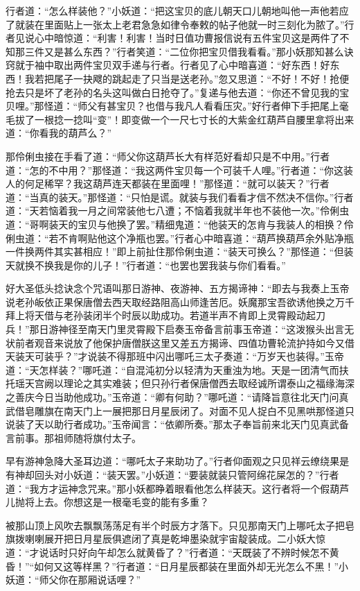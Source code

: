 \documentclass[12pt,UTF8]{ctexbook}
\begin{document}
行者道：“怎么样装他？”小妖道：“把这宝贝的底儿朝天口儿朝地叫他一声他若应了就装在里面贴上一张太上老君急急如律令奉敕的帖子他就一时三刻化为脓了。”行者见说心中暗惊道：“利害！利害！当时日值功曹报信说有五件宝贝这是两件了不知那三件又是甚么东西？”行者笑道：“二位你把宝贝借我看看。”那小妖那知甚么诀窍就于袖中取出两件宝贝双手递与行者。行者见了心中暗喜道：“好东西！好东西！我若把尾子一抉飕的跳起走了只当是送老孙。”忽又思道：“不好！不好！抢便抢去只是坏了老孙的名头这叫做白日抢夺了。”复递与他去道：“你还不曾见我的宝贝哩。”那怪道：“师父有甚宝贝？也借与我凡人看看压灾。”好行者伸下手把尾上毫毛拔了一根捻一捻叫“变”！即变做一个一尺七寸长的大紫金红葫芦自腰里拿将出来道：“你看我的葫芦么？”

那伶俐虫接在手看了道：“师父你这葫芦长大有样范好看却只是不中用。”行者道：“怎的不中用？”那怪道：“我这两件宝贝每一个可装千人哩。”行者道：“你这装人的何足稀罕？我这葫芦连天都装在里面哩！”那怪道：“就可以装天？”行者道：“当真的装天。”那怪道：“只怕是谎。就装与我们看看才信不然决不信你。”行者道：“天若恼着我一月之间常装他七八遭；不恼着我就半年也不装他一次。”伶俐虫道：“哥啊装天的宝贝与他换了罢。”精细鬼道：“他装天的怎肯与我装人的相换？伶俐虫道：“若不肯啊贴他这个净瓶也罢。”行者心中暗喜道：“葫芦换葫芦余外贴净瓶一件换两件其实甚相应！”即上前扯住那伶俐虫道：“装天可换么？”那怪道：“但装天就换不换我是你的儿子！”行者道：“也罢也罢我装与你们看看。”

好大圣低头捻诀念个咒语叫那日游神、夜游神、五方揭谛神：“即去与我奏上玉帝说老孙皈依正果保唐僧去西天取经路阻高山师逢苦厄。妖魔那宝吾欲诱他换之万千拜上将天借与老孙装闭半个时辰以助成功。若道半声不肯即上灵霄殿动起刀兵！”那日游神径至南天门里灵霄殿下启奏玉帝备言前事玉帝道：“这泼猴头出言无状前者观音来说放了他保护唐僧朕这里又差五方揭谛、四值功曹轮流护持如今又借天装天可装乎？”才说装不得那班中闪出哪吒三太子奏道：“万岁天也装得。”玉帝道：“天怎样装？”哪吒道：“自混沌初分以轻清为天重浊为地。天是一团清气而扶托瑶天宫阙以理论之其实难装；但只孙行者保唐僧西去取经诚所谓泰山之福缘海深之善庆今日当助他成功。”玉帝道：“卿有何助？”哪吒道：“请降旨意往北天门问真武借皂雕旗在南天门上一展把那日月星辰闭了。对面不见人捉白不见黑哄那怪道只说装了天以助行者成功。”玉帝闻言：“依卿所奏。”那太子奉旨前来北天门见真武备言前事。那祖师随将旗付太子。

早有游神急降大圣耳边道：“哪吒太子来助功了。”行者仰面观之只见祥云缭绕果是有神却回头对小妖道：“装天罢。”小妖道：“要装就装只管阿绵花屎怎的？”行者道：“我方才运神念咒来。”那小妖都睁着眼看他怎么样装天。这行者将一个假葫芦儿抛将上去。你想这是一根毫毛变的能有多重？

被那山顶上风吹去飘飘荡荡足有半个时辰方才落下。只见那南天门上哪吒太子把皂旗拨喇喇展开把日月星辰俱遮闭了真是乾坤墨染就宇宙靛装成。二小妖大惊道：“才说话时只好向午却怎么就黄昏了？”行者道：“天既装了不辨时候怎不黄昏！”“如何又这等样黑？”行者道：“日月星辰都装在里面外却无光怎么不黑！”小妖道：“师父你在那厢说话哩？”
\end{document}

